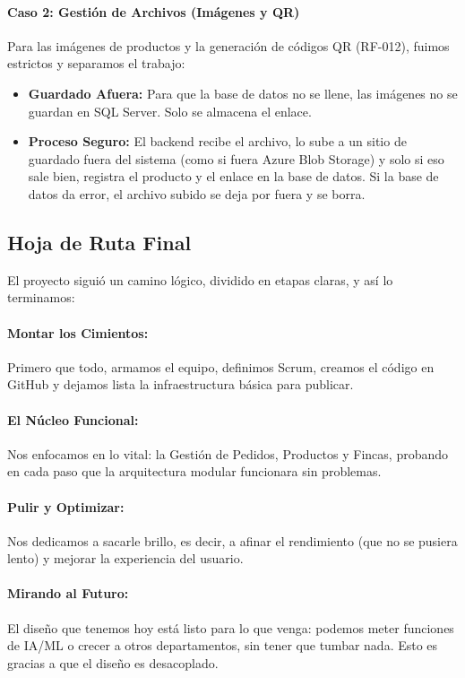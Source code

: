 \paragraph{Caso 2: Gestión de Archivos (Imágenes y QR)}

Para las imágenes de productos y la generación de códigos QR (RF-012), fuimos estrictos y separamos el trabajo:

\begin{itemize}
\item \textbf{Guardado Afuera:} Para que la base de datos no se llene, las imágenes no se guardan en SQL Server. Solo se almacena el enlace.

\item \textbf{Proceso Seguro:} El backend recibe el archivo, lo sube a un sitio de guardado fuera del sistema (como si fuera Azure Blob Storage) y solo si eso sale bien, registra el producto y el enlace en la base de datos. Si la base de datos da error, el archivo subido se deja por fuera y se borra.
\end{itemize}

\subsection{Hoja de Ruta Final}

El proyecto siguió un camino lógico, dividido en etapas claras, y así lo terminamos:

\paragraph{Montar los Cimientos:} Primero que todo, armamos el equipo, definimos Scrum, creamos el código en GitHub y dejamos lista la infraestructura básica para publicar.

\paragraph{El Núcleo Funcional:} Nos enfocamos en lo vital: la Gestión de Pedidos, Productos y Fincas, probando en cada paso que la arquitectura modular funcionara sin problemas.

\paragraph{Pulir y Optimizar:} Nos dedicamos a sacarle brillo, es decir, a afinar el rendimiento (que no se pusiera lento) y mejorar la experiencia del usuario.

\paragraph{Mirando al Futuro:} El diseño que tenemos hoy está listo para lo que venga: podemos meter funciones de IA/ML o crecer a otros departamentos, sin tener que tumbar nada. Esto es gracias a que el diseño es desacoplado.
